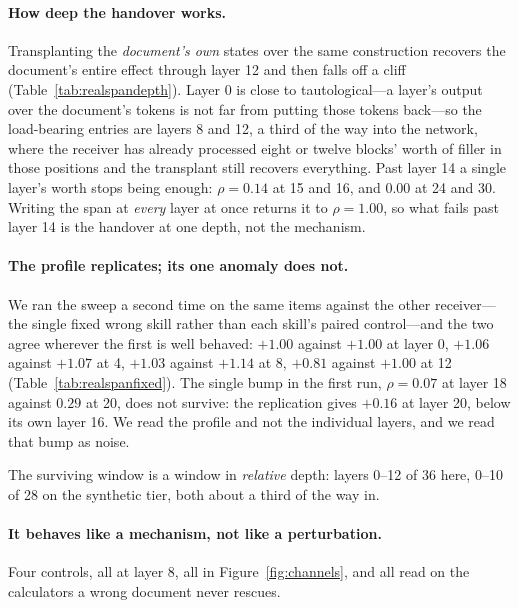 \documentclass{article}
\begin{document}
\paragraph{How deep the handover works.} Transplanting the \emph{document's own}
states over the same construction recovers the document's entire effect through
layer 12 and then falls off a cliff (Table~\ref{tab:realspandepth}). Layer 0 is
close to tautological---a layer's output over the document's tokens is not far
from putting those tokens back---so the load-bearing entries are layers 8 and
12, a third of the way into
the network, where the receiver has already processed eight or twelve blocks'
worth of filler in those positions and the transplant still recovers
everything. Past layer 14 a single layer's worth stops being enough: $\rho =
0.14$ at 15 and 16, and $0.00$ at 24 and 30. Writing
the span at \emph{every} layer at once returns it to $\rho = 1.00$, so what
fails past layer 14 is the handover at one depth, not the mechanism.

\paragraph{The profile replicates; its one anomaly does not.} We ran the sweep a
second time on the same items against the other receiver---the single fixed
wrong skill rather than each skill's paired control---and the two agree wherever
the first is well behaved: $+1.00$ against $+1.00$ at layer 0, $+1.06$ against
$+1.07$ at 4, $+1.03$ against $+1.14$ at 8, $+0.81$ against $+1.00$ at 12
(Table~\ref{tab:realspanfixed}). The single bump in the first run, $\rho=0.07$
at layer 18 against $0.29$ at 20, does not survive: the replication gives $+0.16$
at layer 20, below its own layer 16. We read the profile and not the individual
layers, and we read that bump as noise.



The surviving window is a window in \emph{relative} depth: layers 0--12 of 36
here, 0--10 of 28 on the synthetic tier, both about a third of the way in.



\paragraph{It behaves like a mechanism, not like a perturbation.} Four
controls, all at layer $8$, all in Figure~\ref{fig:channels}, and all read on
the calculators a wrong document never rescues.
\end{document}
